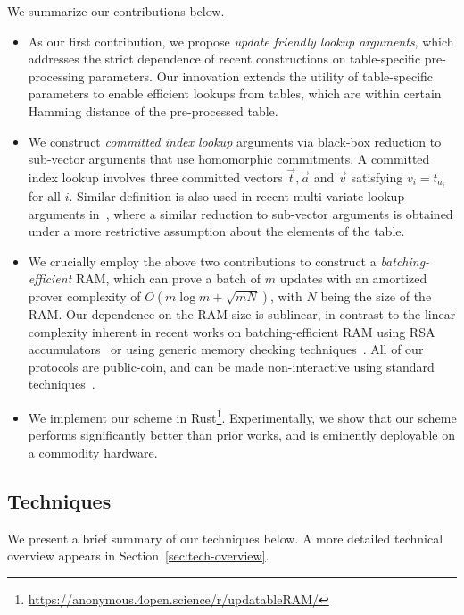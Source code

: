 We summarize our contributions below.
\begin{itemize}[leftmargin=2em]
	\item As our first contribution, we propose {\em update friendly lookup arguments}, which addresses
	the strict dependence of recent constructions on table-specific pre-processing parameters. Our
	innovation extends the utility of table-specific parameters to enable efficient lookups from tables,
	which are within certain Hamming distance of the pre-processed table.
	\item We construct {\em committed index lookup} arguments via black-box reduction to
	sub-vector arguments that use homomorphic commitments. A committed index lookup involves
	three committed vectors $\vec{t},\vec{a}$ and $\vec{v}$ satisfying $v_i=t_{a_i}$ for all $i$. Similar
	definition is also used in recent multi-variate lookup arguments in~\cite{lasso}, where a similar reduction
	to sub-vector arguments is obtained under a more restrictive assumption about the elements of the table.
	\item We crucially employ the above two contributions to construct a {\em batching-efficient} RAM, which
	can prove a batch of $m$ updates with an amortized prover complexity of $O(m\log m + \sqrt{mN})$,
	with $N$ being the size of the RAM. Our dependence on the RAM size is sublinear, in contrast to the linear complexity
	inherent in recent works on batching-efficient RAM using RSA accumulators~\cite{USENIX:OWWB20,CCS:CFHKKO22} or using generic memory checking techniques~\cite{NDSS:WSRBW15,USENIX:BCTV14,C:BCGTV13,SP:ZGKPP18}. All of our protocols are public-coin, and can be made non-interactive using standard techniques~\cite{C:FiaSha86}. 
	
	\item We implement our scheme in Rust\footnote{\url{https://anonymous.4open.science/r/updatableRAM/}}.
	Experimentally, we show that our scheme performs significantly better than prior works,
	and is eminently deployable on a commodity hardware.
\end{itemize}


\subsection{Techniques}\label{subsec:techniques}

We present a brief summary of our techniques below. A more detailed technical overview appears in Section~\ref{sec:tech-overview}.

\smallskip

